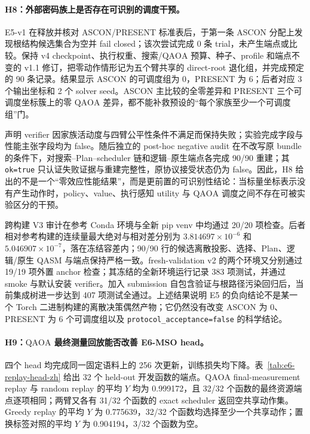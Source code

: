 \documentclass[UTF8,fontset=fandol,11pt]{ctexart}
\newcommand{\qaoa}{\ensuremath{\mathrm{QAOA}}}
\begin{document}
\paragraph{H8：外部密码族上是否存在可识别的调度干预。}
E5-v1 在释放并核对 ASCON/PRESENT 标准表后，于第一条 ASCON 分配上发现根结构候选集合为空并 fail closed；该次尝试完成 0 条 trial，未产生端点或比较。保持 v4 checkpoint、执行权重、搜索/\qaoa{} 预算、种子、profile 和端点不变的 v1.1 修订，把零动作情形记为五个臂共享的 direct-root 退化组，并完成预定的 90 条记录。结果显示 ASCON 的可调度组为 0，PRESENT 为 6；后者对应 3 个输出坐标和 2 个 solver seed。ASCON 主比较的全零差异和 PRESENT 三个可调度坐标簇上的零 \qaoa{} 差异，都不能补救预设的“每个家族至少一个可调度组”门。

声明 verifier 因家族活动度与四臂公平性条件不满足而保持失败；实验完成字段与性能主张字段均为 false。随后独立的 post-hoc negative audit 在不改写原 bundle 的条件下，对搜索--Plan--scheduler 链和逻辑--原生端点各完成 90/90 重建；其 \texttt{ok=true} 只认证失败证据与重建完整性，原协议接受状态仍为 false。因此，H8 给出的不是一个“零效应性能结果”，而是更前置的可识别性结论：当标量坐标表示没有产生动作时，policy、value、执行感知 utility 与 \qaoa{} 调度之间不存在可被实验区分的干预。

跨构建 V3 审计在参考 Conda 环境与全新 pip venv 中均通过 20/20 项检查。后者相对参考构建的连续量最大绝对与相对差分别为 $3.814697\times10^{-6}$ 和 $5.046907\times10^{-7}$，落在冻结容差内；90/90 行的候选离散投影、选择、Plan、逻辑/原生 QASM 与端点保持严格一致。fresh-validation v2 的两个环境又分别通过 19/19 项外置 anchor 检查；其冻结的全新环境运行记录 383 项测试，并通过 smoke 与默认安装 verifier。加入 submission 自包含验证与根路径污染回归后，当前集成树进一步达到 407 项测试全通过。上述结果说明 E5 的负向结论不是某一个 Torch 二进制构建的离散决策偶然产物；它仍然没有改变 ASCON 为 0、PRESENT 为 6 个可调度组以及 \texttt{protocol\_acceptance=false} 的科学结论。

\paragraph{H9：\qaoa{} 最终测量回放能否改善 E6-MSO head。}
四个 head 均完成同一固定语料上的 256 次更新，训练损失均下降。表~\ref{tab:e6-replay-head-zh} 给出 32 个 held-out 开发函数的端点。\qaoa{} final-measurement replay 与 random replay 的平均 $Y$ 均为 0.999172，且 32/32 个函数的最终资源端点逐项相同；两臂又各有 31/32 个函数的 exact scheduler 返回空共享动作集。Greedy replay 的平均 $Y$ 为 0.775639，32/32 个函数均选择至少一个共享动作；置换标签对照的平均 $Y$ 为 0.904194，3/32 个函数为空。
\end{document}
